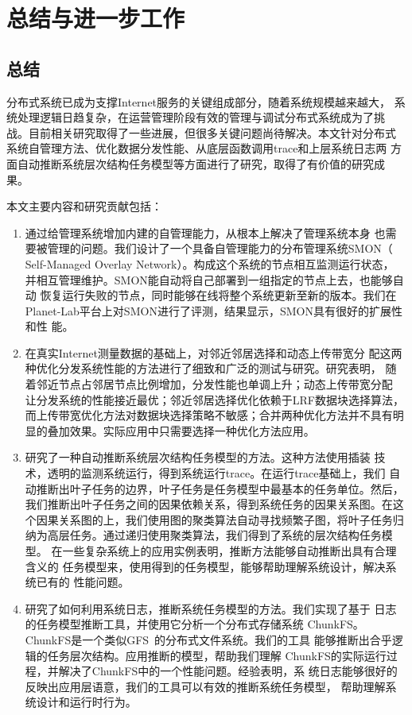 \chapter{总结与进一步工作}
\label{chap:conclusion}

\section{总结}

分布式系统已成为支撑Internet服务的关键组成部分，随着系统规模越来越大，
系统处理逻辑日趋复杂，在运营管理阶段有效的管理与调试分布式系统成为了挑
战。目前相关研究取得了一些进展，但很多关键问题尚待解决。本文针对分布式
系统自管理方法、优化数据分发性能、从底层函数调用trace和上层系统日志两
方面自动推断系统层次结构任务模型等方面进行了研究，取得了有价值的研究成
果。

本文主要内容和研究贡献包括：

\begin{enumerate}
  
  \item 通过给管理系统增加内建的自管理能力，从根本上解决了管理系统本身
  也需要被管理的问题。我们设计了一个具备自管理能力的分布管理系统SMON（
  Self-Managed Overlay Network）。构成这个系统的节点相互监测运行状态，
  并相互管理维护。SMON能自动将自己部署到一组指定的节点上去，也能够自动
  恢复运行失败的节点，同时能够在线将整个系统更新至新的版本。我们在
  Planet-Lab平台上对SMON进行了评测，结果显示，SMON具有很好的扩展性和性
  能。

  \item 在真实Internet测量数据的基础上，对邻近邻居选择和动态上传带宽分
  配这两种优化分发系统性能的方法进行了细致和广泛的测试与研究。研究表明，
  随着邻近节点占邻居节点比例增加，分发性能也单调上升；动态上传带宽分配
  让分发系统的性能接近最优；邻近邻居选择优化依赖于LRF数据块选择算法，
  而上传带宽优化方法对数据块选择策略不敏感；合并两种优化方法并不具有明
  显的叠加效果。实际应用中只需要选择一种优化方法应用。

  \item 研究了一种自动推断系统层次结构任务模型的方法。这种方法使用插装
  技术，透明的监测系统运行，得到系统运行trace。在运行trace基础上，我们
  自动推断出叶子任务的边界，叶子任务是任务模型中最基本的任务单位。然后，
  我们推断出叶子任务之间的因果依赖关系，得到系统任务的因果关系图。在这
  个因果关系图的上，我们使用图的聚类算法自动寻找频繁子图，将叶子任务归
  纳为高层任务。通过递归使用聚类算法，我们得到了系统的层次结构任务模型。
  在一些复杂系统上的应用实例表明，推断方法能够自动推断出具有合理含义的
  任务模型来，使用得到的任务模型，能够帮助理解系统设计，解决系统已有的
  性能问题。

  \item 研究了如何利用系统日志，推断系统任务模型的方法。我们实现了基于
  日志的任务模型推断工具，并使用它分析一个分布式存储系统
  ChunkFS。ChunkFS是一个类似GFS~\cite{gfs}的分布式文件系统。我们的工具
  能够推断出合乎逻辑的任务层次结构。应用推断的模型，帮助我们理解
  ChunkFS的实际运行过程，并解决了ChunkFS中的一个性能问题。经验表明，系
  统日志能够很好的反映出应用层语意，我们的工具可以有效的推断系统任务模型，
  帮助理解系统设计和运行时行为。

\end{enumerate}

